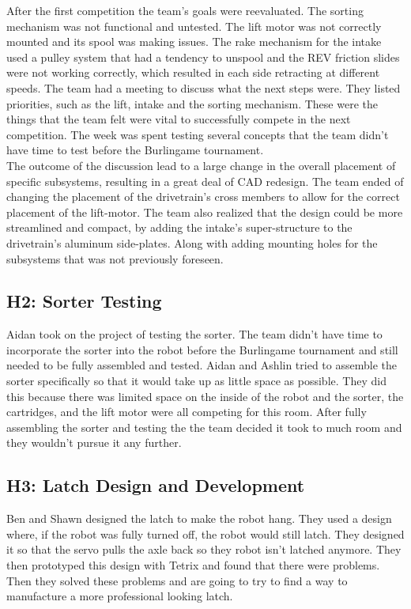 \documentclass{article}
\begin{document}
After the first competition the team's goals were reevaluated. The sorting mechanism was not functional and untested. The lift motor was not correctly mounted and its spool was making issues. The rake mechanism for the intake used a pulley system that had a tendency to unspool and the REV friction slides were not working correctly, which resulted in each side retracting at different speeds. The team had a meeting to discuss what the next steps were. They listed priorities, such as the lift, intake and the sorting mechanism. These were the things that the team felt were vital to successfully compete in the next competition. The week was spent testing several concepts that the team didn't have time to test before the Burlingame tournament. \\

The outcome of the discussion lead to a large change in the overall placement of specific subsystems, resulting in a great deal of CAD redesign. The team ended of changing the placement of the drivetrain's cross members to allow for the correct placement of the lift-motor. The team also realized that the design could be more streamlined and compact, by adding the intake's super-structure to the drivetrain's aluminum side-plates. Along with adding mounting holes for the subsystems that was not previously foreseen.  


\subsection{H2: Sorter Testing}

Aidan took on the project of testing the sorter. The team didn't have time to incorporate the sorter into the robot before the Burlingame tournament and still needed to be fully assembled and tested. Aidan and Ashlin tried to assemble the sorter specifically so that it would take up as little space as possible. They did this because there was limited space on the inside of the robot and the sorter, the cartridges, and the lift motor were all competing for this room. After fully assembling the sorter and testing the the team decided it took to much room and they wouldn't pursue it any further.

\subsection{H3: Latch Design and Development}

Ben and Shawn designed the latch to make the robot hang. They used a design where, if the robot was fully turned off, the robot would still latch. They designed it so that the servo pulls the axle back so they robot isn't latched anymore. They then prototyped this design with Tetrix and found that there were problems. Then they solved these problems and are going to try to find a way to manufacture a more professional looking latch.
\end{document}
